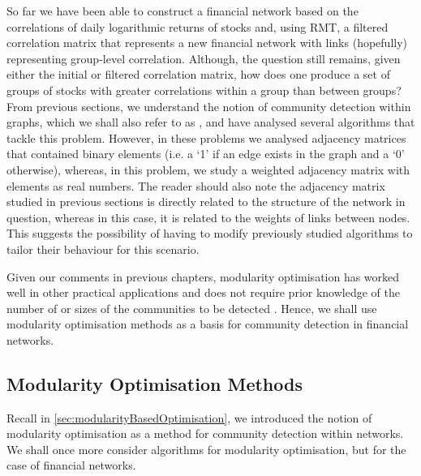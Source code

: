 So far we have been able to construct a financial network based on the correlations of daily logarithmic returns of stocks and, using RMT, a filtered correlation matrix that represents a new financial network with links (hopefully) representing group-level correlation.
Although, the question still remains, given either the initial or filtered correlation matrix, how does one produce a set of groups of stocks with greater correlations within a group than between groups?
From previous sections, we understand the notion of community detection within graphs, which we shall also refer to as , and have analysed several algorithms that tackle this problem.
However, in these problems we analysed adjacency matrices that contained binary elements (i.e. a `1' if an edge exists in the graph and a `0' otherwise), whereas, in this problem, we study a weighted adjacency matrix with elements as real numbers.
The reader should also note the adjacency matrix studied in previous sections is directly related to the structure of the network in question, whereas in this case, it is related to the weights of links between nodes.
This suggests the possibility of having to modify previously studied algorithms to tailor their behaviour for this scenario.

Given our comments in previous chapters, modularity optimisation has worked well in other practical applications and does not require prior knowledge of the number of or sizes of the communities to be detected \cite{HGH+12,MG13}.
Hence, we shall use modularity optimisation methods as a basis for community detection in financial networks.


\subsection{Modularity Optimisation Methods}
\label{subsec:modularityOptimisationMethods}

Recall in \cref{sec:modularityBasedOptimisation}, we introduced the notion of modularity optimisation as a method for community detection within networks.
We shall once more consider algorithms for modularity optimisation, but for the case of financial networks.

